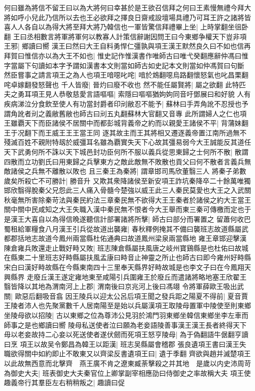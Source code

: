 何曰雖為將信不留王曰以為大將何曰幸甚於是王欲召信拜之何曰王素慢無禮今拜大將如呼小兒此乃信所以去也王必欲拜之擇良日齋戒設壇場具禮乃可耳王許之諸將皆喜人人各自以為得大將至拜大將乃韓信也一軍皆驚信拜禮畢上坐|{
	上時掌翻坐徂卧翻}
王曰丞相數言將軍將軍何以教寡人計策信辭謝因問王曰今東鄉争權天下豈非項王邪|{
	鄉讀曰嚮}
漢王曰然曰大王自料勇悍仁彊孰與項王漢王默然良久曰不如也信再拜賀曰惟信亦以為大王不如也|{
	惟史記作惟漢書作唯師古曰唯弋癸翻應辭仲馮曰惟字當屬下句讀如本字予謂如漢書本文則當如師古如史記本文則當如仲馮賀曰句斷}
然臣嘗事之請言項王之為人也項王喑噁叱咤|{
	喑於鴆翻噁烏路翻懷怒氣也叱昌栗翻咤卓嫁翻發怒聲也}
千人皆廢|{
	晉灼曰廢不收也}
然不能任屬賢將|{
	屬之欲翻}
此特匹夫之勇耳項王見人恭敬慈愛言語嘔嘔|{
	索隱曰嘔嘔猶姁姁同音吁鄧展曰和好貌}
人有疾病涕泣分食飲至使人有功當封爵者印刓敝忍不能予|{
	蘇林曰手弄角訛不忍授也予謂角訛者刓之義敝舊敝也師古曰刓五丸翻蘇林大官翻又音專}
此所謂婦人之仁也項王雖覇天下而臣諸侯不居關中而都彭城背義帝之約而以親愛王諸侯不平|{
	背蒲妹翻王于况翻下而王威王王王當王同}
逐其故主而王其將相又遷逐義帝置江南所過無不殘滅百姓不親附特刼於威彊耳名雖為覇實失天下心故其彊易弱今大王誠能反其道任天下武勇何所不誅以天下城邑封功臣何所不服以義兵從思東歸之士何所不散|{
	散謂四散而立功劉氏曰用東歸之兵擊東方之敵此敵無不敗散也貢父曰何不散者言義兵無敵諸侯之兵無不離散以敗也}
且三秦王為秦將|{
	謂章邯司馬欣董翳三人}
將秦子弟數歲矣所殺亡不可勝計|{
	勝音升}
又欺其衆降諸侯至新安項王詐坑秦降卒二十餘萬唯獨邯欣翳得脫秦父兄怨此三人痛入骨髓今楚強以威王此三人秦民莫愛也大王之入武關秋毫無所害除秦苛法與秦民約法三章秦民無不欲得大王王秦者於諸侯之約大王當王關中關中民咸知之大王失職入漢中秦民無不恨者今大王舉而東三秦可傳檄而定也于是漢王大喜自以為得信晩遂聽信計部署諸將所擊|{
	師古曰部分而署置之}
留蕭何收巴蜀租給軍糧食八月漢王引兵從故道出襲雍|{
	春秋釋例掩其不備曰襲班志故道縣屬武都郡括地志故道今鳳州兩當縣杜佑通典曰故道鳳州梁泉兩當縣地}
雍王章邯迎擊漢陳倉雍兵敗還走止戰好畤又敗|{
	班志陳倉縣屬扶風唐之岐州寶鷄縣是也杜佑曰故城在縣東二十里班志好畤縣屬扶風孟康曰畤音止神靈之所止也師古曰即今雍州好畤縣宋白曰漢好畤故縣在今縣東南四十三里奉天縣界好畤故城是也李文子曰在今鳳翔天興縣界}
走廢丘漢王遂定雍地東至咸陽引兵圍雍王於廢丘而遣諸將略地塞王欣翟王翳皆降以其地為渭南河上上郡|{
	渭南後曰京兆河上後曰馮翊}
令將軍薛歐王吸出武關|{
	歐惡后翻吸音翕}
因王陵兵以迎太公呂后項王聞之發兵距之陽夏不得前|{
	夏音賈}
王陵者沛人也先聚黨數千人居南陽至是始以兵屬漢項王取陵母置軍中陵使至則東鄉坐陵母欲以招陵|{
	古以東鄉之位為尊沛公見羽於鴻門羽東鄉坐韓信東鄉坐李左車而師事之是也鄉讀曰嚮}
陵母私送使者泣曰願為老妾語陵善事漢王漢王長者終得天下毋以老妾故持二心妾以死送使者遂伏劒而死項王怒亨陵母|{
	為于偽翻語牛倨翻亨讀曰烹}
項王以故吴令鄭昌為韓王以距漢|{
	班志吴縣屬會稽郡}
張良遺項王書曰漢王失職欲得關中如約即止不敢東又以齊梁反書遺項王曰|{
	遺于季翻}
齊欲與趙并滅楚項王以此故無西意而北擊齊　燕王廣不肯之遼東臧荼擊殺之并其地　是歲以内史沛周苛為御史大夫|{
	班表御史大夫秦官位上卿掌副宰相應劭曰侍御史之率故稱大夫}
項王使趣義帝行其羣臣左右稍稍叛之|{
	趣讀曰促}


